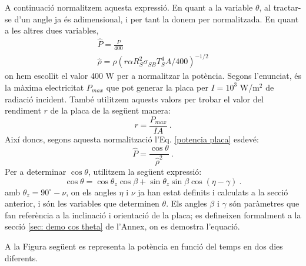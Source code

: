 \documentclass[11pt]{article}
\begin{document}
A continuació normalitzem aquesta expressió. En quant a la variable $\theta$, al tractar-se d'un angle ja és adimensional, i per tant la donem per normalitzada. En quant a les altres dues variables,
\begin{align}
    \hat{P}=\frac{P}{400} \label{P normalizada} \\
    \hat{\rho}= \rho \left( r \alpha R_S^2\sigma_{SB}T_S^4A/400 \right)^{-1/2} \label{rho normalizada}
\end{align}
on hem escollit el valor 400 W per a normalitzar la potència. Segons l'enunciat, és la màxima electricitat $P_{max}$ que pot generar la placa per $I=10^3$ W/$\text{m}^2$ de radiació incident. També utilitzem aquests valors per trobar el valor del rendiment $r$ de la placa de la següent manera:
\begin{equation}
     r = \frac{P_{max}}{IA} \ .
\end{equation}
Així doncs, segons aquesta normalització l'Eq. \eqref{potencia placa} esdevé:
\begin{equation}
    \hat{P} = \frac{\cos{\theta}}{\hat{\rho}^2} \ .
    \label{pot norm}
\end{equation}
Per a determinar $\cos{\theta}$, utilitzem la següent expressió:
\begin{equation}
    \cos \theta = \cos \theta_z \cos \beta + \sin \theta_z \sin \beta \cos (\eta - \gamma) \ .
    \label{cos theta}
\end{equation}
amb $\theta_z = 90^{\circ}-\nu$, on els angles $\eta$ i $\nu$ ja han estat definits i calculats a la secció anterior, i són les variables que determinen $\theta$. Els angles $\beta$ i $\gamma$ són paràmetres que fan referència a la inclinació i orientació de la placa; es defineixen formalment a la secció \ref{sec: demo cos theta} de l'Annex, on es demostra l'equació.

A la Figura següent es representa la potència en funció del temps en dos dies diferents.
\end{document}
